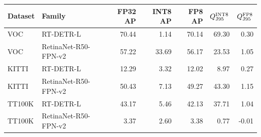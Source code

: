 \begin{tabular}{llrrrrr}
\toprule
Dataset & Family & FP32 AP & INT8 AP & FP8 AP & $Q_{\mathrm{J95}}^{\mathrm{INT8}}$ & $Q_{\mathrm{J95}}^{\mathrm{FP8}}$ \\
\midrule
VOC & RT-DETR-L & 70.44 & 1.14 & 70.14 & 69.30 & 0.30 \\
VOC & RetinaNet-R50-FPN-v2 & 57.22 & 33.69 & 56.17 & 23.53 & 1.05 \\
KITTI & RT-DETR-L & 12.29 & 3.32 & 12.02 & 8.97 & 0.27 \\
KITTI & RetinaNet-R50-FPN-v2 & 50.43 & 7.13 & 49.27 & 43.30 & 1.15 \\
TT100K & RT-DETR-L & 43.17 & 5.46 & 42.13 & 37.71 & 1.04 \\
TT100K & RetinaNet-R50-FPN-v2 & 3.37 & 2.60 & 3.38 & 0.77 & -0.01 \\
\bottomrule
\end{tabular}